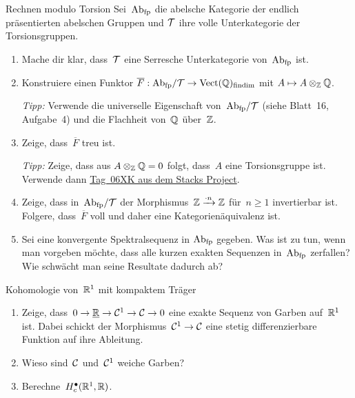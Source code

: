 \documentclass{uebblatt}
\begin{document}

\begin{aufgabe}{Rechnen modulo Torsion}
Sei~$\mathrm{Ab}_\text{fp}$ die abelsche Kategorie der endlich präsentierten abelschen
Gruppen und $\mathcal{T}$ ihre volle Unterkategorie der Torsionsgruppen.
\begin{enumerate}
\item Mache dir klar, dass~$\mathcal{T}$ eine Serresche Unterkategorie
von~$\mathrm{Ab}_\text{fp}$ ist.
\item Konstruiere einen Funktor $\overline{F} : \mathrm{Ab}_\text{fp}/\mathcal{T} \to
\mathrm{Vect}(\mathbb{Q})_\text{findim}$ mit $A \mapsto A \otimes_{\mathbb{Z}} \mathbb{Q}$.

{\tiny\emph{Tipp:} Verwende die universelle Eigenschaft von~$\mathrm{Ab}_\text{fp}/\mathcal{T}$
(siehe Blatt~16, Aufgabe~4) und die Flachheit von~$\mathbb{Q}$ über~$\mathbb{Z}$.\par}

\item Zeige, dass~$\overline{F}$ treu ist.

{\tiny\emph{Tipp:} Zeige, dass aus $A \otimes_{\mathbb{Z}} \mathbb{Q} = 0$ folgt,
dass~$A$ eine Torsionsgruppe ist. Verwende dann
\href{http://stacks.math.columbia.edu/tag/06XK}{Tag~06XK aus dem Stacks
Project}.\par}
\item Zeige, dass in~$\mathrm{Ab}_\text{fp}/\mathcal{T}$ der Morphismus~$\mathbb{Z} \xrightarrow{\cdot
n} \mathbb{Z}$ für~$n \geq 1$ invertierbar ist. Folgere, dass~$\overline{F}$
voll und daher eine Kategorienäquivalenz ist.
\item Sei eine konvergente Spektralsequenz in $\mathrm{Ab}_\text{fp}$ gegeben. Was ist
zu tun, wenn man vorgeben möchte, dass alle kurzen exakten Sequenzen
in~$\mathrm{Ab}_\text{fp}$ zerfallen? Wie schwächt man seine Resultate dadurch ab?
\end{enumerate}
\end{aufgabe}

\begin{aufgabe}{Kohomologie von~$\mathbb{R}^1$ mit kompaktem Träger}
\begin{enumerate}
\item Zeige, dass~$0 \to \underline{\mathbb{R}} \to \mathcal{C}^1 \to
\mathcal{C} \to 0$ eine exakte Sequenz von Garben auf~$\mathbb{R}^1$ ist. Dabei schickt der Morphismus~$\mathcal{C}^1
\to \mathcal{C}$ eine stetig differenzierbare Funktion auf ihre Ableitung.
\item Wieso sind~$\mathcal{C}$ und~$\mathcal{C}^1$ weiche Garben?
\item Berechne~$H^\bullet_c(\mathbb{R}^1, \mathbb{R})$.
\end{enumerate}
\end{aufgabe}
\end{document}
